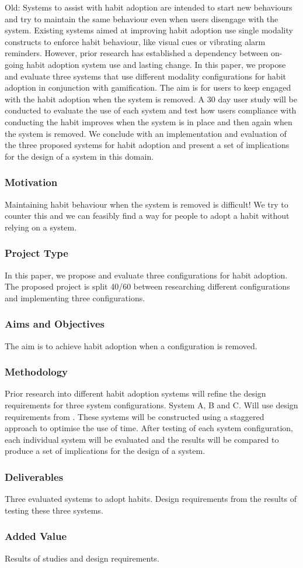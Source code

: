 Old: Systems to assist with habit adoption are intended to start new behaviours and try to maintain the same behaviour even when users disengage with the system. Existing systems aimed at improving habit adoption use single modality constructs to enforce habit behaviour, like visual cues or vibrating alarm reminders. However, prior research has established a dependency between on-going habit adoption system use and lasting change. In this paper, we propose and evaluate three systems that use different modality configurations for habit adoption in conjunction with gamification. The aim is for users to keep engaged with the habit adoption when the system is removed. A 30 day user study will be conducted to evaluate the use of each system and test how users compliance with conducting the habit improves when the system is in place and then again when the system is removed. We conclude with an implementation and evaluation of the three proposed systems for habit adoption and present a set of implications for the design of a system in this domain.

\subsubsection*{Motivation}
Maintaining habit behaviour when the system is removed is difficult! We try to counter this and we can feasibly find a way for people to adopt a habit without relying on a system.


\subsubsection*{Project Type}
In this paper, we propose and evaluate three configurations for habit adoption.
The proposed project is split 40/60 between researching different configurations and implementing three configurations.


\subsubsection*{Aims and Objectives}
The aim is to achieve habit adoption when a configuration is removed.


\subsubsection*{Methodology}
Prior research into different habit adoption systems will refine the design requirements for three system configurations. System A, B and C.\newline
Will use design requirements from \cite{article_dont_forget_your_pill}.
These systems will be constructed using a staggered approach to optimise the use of time.
After testing of each system configuration, each individual system will be evaluated and the results will be compared to produce a set of implications for the design of a system.


\subsubsection*{Deliverables}
Three evaluated systems to adopt habits. Design requirements from the results of testing these three systems.


\subsubsection*{Added Value}
Results of studies and design requirements.


